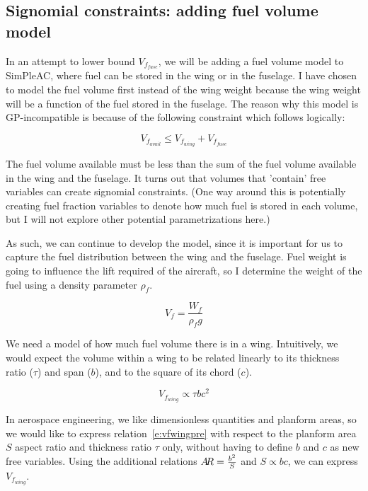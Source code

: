 \subsection{Signomial constraints: adding fuel volume model}
\label{s:fuel}

In an attempt to lower bound $V_{f_{fuse}}$, we will
be adding a fuel volume model to SimPleAC, where fuel can be stored in the wing or
in the fuselage. I have chosen to model the fuel volume first instead of the wing
weight because the wing weight will be a function of the fuel stored in the fuselage.
The reason why this model is \gls{GP}-incompatible is because of the
following constraint which follows logically:

\begin{equation}
	V_{f_{avail}} \leq V_{f_{wing}} + V_{f_{fuse}}
	\label{vfavail}
\end{equation}

The fuel volume available must be less than the sum of the fuel volume available in the
wing and the fuselage. It turns out that volumes that 'contain' free variables
can create signomial constraints. (One way around this is potentially creating fuel
fraction variables to denote how much fuel is stored in each volume, but I will not 
explore other potential parametrizations here.)

As such, we can continue to develop the model, since it is important for us to
capture the fuel distribution between the wing and the fuselage. Fuel weight is going
to influence the lift required of the aircraft, so I determine the weight of the fuel
using a density parameter $\rho_{f}$. 

\begin{equation}
    V_f = \frac{W_f } {\rho_f g}
    \label{e:vf}
\end{equation}

We need a model of how much fuel volume there is in a wing. Intuitively,
we would expect the volume within a wing
to be related linearly to its thickness ratio ($\tau$) and span ($b$),
and to the square of its chord ($c$). 

\begin{equation}
	V_{f_{wing}} \propto \tau b c^2
	\label{e:vfwingpre}
\end{equation} 

In aerospace engineering, we like dimensionless quantities and planform areas, 
so we would like to express relation~\ref{e:vfwingpre} with respect to the planform area $S$
aspect ratio \AR and thickness ratio $\tau$ only, without having to define $b$ and $c$ as new
free variables.
Using the additional relations $A\hspace{-2.0pt}R = \frac{b^2}{S}$ and $S \propto b c$, we can
express $V_{f_{wing}}$.

